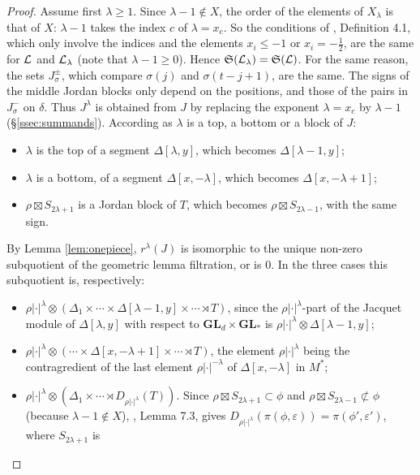 \documentclass[a4paper,12pt,leqno]{amsart}
\theoremstyle{plain}
\theoremstyle{definition}
\providecommand{\frS}{\mathfrak{S}}\providecommand{\frs}{\mathfrak{s}}
\begin{document}
\begin{proof}
Assume first $\lambda\geq1$. Since $\lambda-1\notin X$, the order of the elements of $X_\lambda$ is that of $X$: $\lambda-1$ takes the
index $c$ of $\lambda=x_c$. So the conditions of \cite{Ato24}, Definition 4.1, which only involve
the indices and the elements $x_i\leq-1$ or $x_i=-\tfrac12$, are the same for $\mathcal{L}$ and $\mathcal{L}_\lambda$
(note that $\lambda-1\geq0$). Hence $\frS(\caL_\lambda)=\frS(\caL)$. For the same reason, the sets
$J^\pm_\sigma$, which compare $\sigma(j)$ and $\sigma(t-j+1)$, are the same. The signs of the
middle Jordan blocks only depend on the positions, and those of the pairs in $J^-_\sigma$ on
$\delta$. Thus $J^\lambda$ is obtained from $J$ by replacing the exponent $\lambda=x_c$ by $\lambda-1$
(\S\ref{ssec:summands}). According as $\lambda$ is a top, a bottom or a block of $J$:
\begin{itemize}
\item[(t)] $\lambda$ is the top of a segment $\Delta[\lambda,y]$, which becomes $\Delta[\lambda-1,y]$;
\item[(b)] $\lambda$ is a bottom, of a segment $\Delta[x,-\lambda]$, which becomes
$\Delta[x,-\lambda+1]$;
\item[(d)] $\rho\boxtimes S_{2\lambda+1}$ is a Jordan block of $T$, which becomes
$\rho\boxtimes S_{2\lambda-1}$, with the same sign.
\end{itemize}
By Lemma \ref{lem:onepiece}, $r^\lambda(J)$ is isomorphic to the unique non-zero subquotient of the
geometric lemma filtration, or is $0$. In the three cases this subquotient is, respectively:
\begin{itemize}
\item[(t)] $\rho|\cdot|^\lambda\otimes(\Delta_1\times\cdots\times\Delta[\lambda-1,y]\times\cdots
\rtimes T)$, since the $\rho|\cdot|^\lambda$-part of the Jacquet module of $\Delta[\lambda,y]$ with
respect to $\mathbf{GL}_d\times\mathbf{GL}_{*}$ is $\rho|\cdot|^\lambda\otimes\Delta[\lambda-1,y]$;
\item[(b)] $\rho|\cdot|^\lambda\otimes(\cdots\times\Delta[x,-\lambda+1]\times\cdots\rtimes T)$, the
element $\rho|\cdot|^\lambda$ being the contragredient of the last element $\rho|\cdot|^{-\lambda}$ of
$\Delta[x,-\lambda]$ in $M^*$;
\item[(d)] $\rho|\cdot|^\lambda\otimes(\Delta_1\times\cdots\rtimes D_{\rho|\cdot|^\lambda}(T))$.
Since $\rho\boxtimes S_{2\lambda+1}\subset\phi$ and $\rho\boxtimes S_{2\lambda-1}\not\subset\phi$
(because $\lambda-1\notin X$), \cite{Xu17}, Lemma 7.3, gives
$D_{\rho|\cdot|^\lambda}(\pi(\phi,\varepsilon))=\pi(\phi',\varepsilon')$, where $S_{2\lambda+1}$ is

\end{itemize}
\end{proof}
\end{document}

